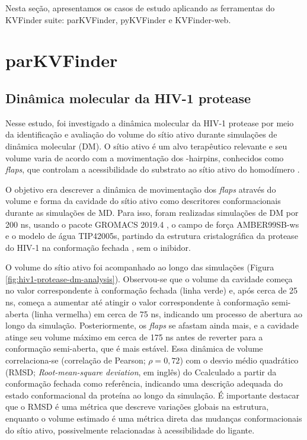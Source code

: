 \documentclass[Portugues]{phdquali}
\begin{document}
Nesta seção, apresentamos os casos de estudo aplicando as ferramentas do KVFinder suite: parKVFinder, pyKVFinder e KVFinder-web.

\section{parKVFinder \label{ap:casos-de-estudo-parkvfinder}}

\subsection{Dinâmica molecular da HIV-1 protease \label{sec:md-hiv1-protease}}

Nesse estudo, foi investigado a dinâmica molecular da HIV-1 protease por meio da identificação e avaliação do volume do sítio ativo durante simulações de dinâmica molecular (DM). O sítio ativo é um alvo terapêutico relevante e seu volume varia de acordo com a movimentação dos \textbeta-hairpins, conhecidos como \textit{flaps}, que controlam a acessibilidade do substrato ao sítio ativo do homodímero \cite{lam1994,soares2016}. %

O objetivo era descrever a dinâmica de movimentação dos \textit{flaps} através do volume e forma da cavidade do sítio ativo como descritores conformacionais durante as simulações de MD. Para isso, foram realizadas simulações de DM por 200 ns, usando o pacote GROMACS 2019.4 \cite{gromacs}, o campo de força AMBER99SB-ws e o modelo de água TIP42005s, partindo da estrutura cristalográfica da protease do HIV-1 na conformação fechada \cite{lam1994}, sem o inibidor.

O volume do sítio ativo foi acompanhado ao longo das simulações (Figura \ref{fig:hiv1-protease-dm-analysis}). Observou-se que o volume da cavidade começa no valor correspondente à conformação fechada (linha verde) e, após cerca de 25 ns, começa a aumentar até atingir o valor correspondente à conformação semi-aberta (linha vermelha) em cerca de 75 ns, indicando um processo de abertura ao longo da simulação. Posteriormente, os \textit{flaps} se afastam ainda mais, e a cavidade atinge seu volume máximo em cerca de 175 ns antes de reverter para a conformação semi-aberta, que é mais estável. Essa dinâmica de volume correlaciona-se (correlação de Pearson; $\rho = 0,72$) com o desvio médio quadrático (RMSD; \textit{Root-mean-square deviation}, em inglês) do C\textalpha\space calculado a partir da conformação fechada como referência, indicando uma descrição adequada do estado conformacional da proteína ao longo da simulação. É importante destacar que o RMSD é uma métrica que descreve variações globais na estrutura, enquanto o volume estimado é uma métrica direta das mudanças conformacionais do sítio ativo, possivelmente relacionadas à acessibilidade do ligante.
\end{document}
